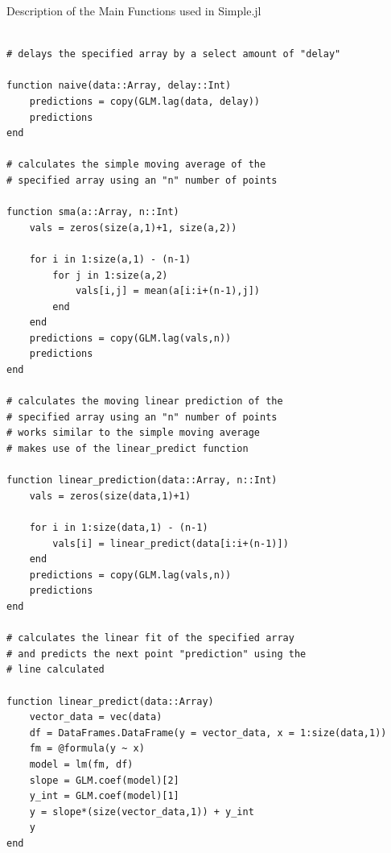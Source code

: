 \begin{listing}[h]
\caption{Description of the Main Functions used in Simple.jl}
\label{lst: Simple.jl}
\begin{verbatim}

# delays the specified array by a select amount of "delay"

function naive(data::Array, delay::Int)
    predictions = copy(GLM.lag(data, delay))
    predictions
end

# calculates the simple moving average of the
# specified array using an "n" number of points

function sma(a::Array, n::Int)
    vals = zeros(size(a,1)+1, size(a,2))

    for i in 1:size(a,1) - (n-1)
        for j in 1:size(a,2)
            vals[i,j] = mean(a[i:i+(n-1),j])
        end
    end
    predictions = copy(GLM.lag(vals,n))
    predictions
end

# calculates the moving linear prediction of the
# specified array using an "n" number of points
# works similar to the simple moving average
# makes use of the linear_predict function

function linear_prediction(data::Array, n::Int)
    vals = zeros(size(data,1)+1)

    for i in 1:size(data,1) - (n-1)
        vals[i] = linear_predict(data[i:i+(n-1)])
    end
    predictions = copy(GLM.lag(vals,n))
    predictions
end

# calculates the linear fit of the specified array
# and predicts the next point "prediction" using the
# line calculated

function linear_predict(data::Array)
    vector_data = vec(data)
    df = DataFrames.DataFrame(y = vector_data, x = 1:size(data,1))
    fm = @formula(y ~ x)
    model = lm(fm, df)
    slope = GLM.coef(model)[2]
    y_int = GLM.coef(model)[1]
    y = slope*(size(vector_data,1)) + y_int
    y
end

\end{verbatim}
\end{listing}

